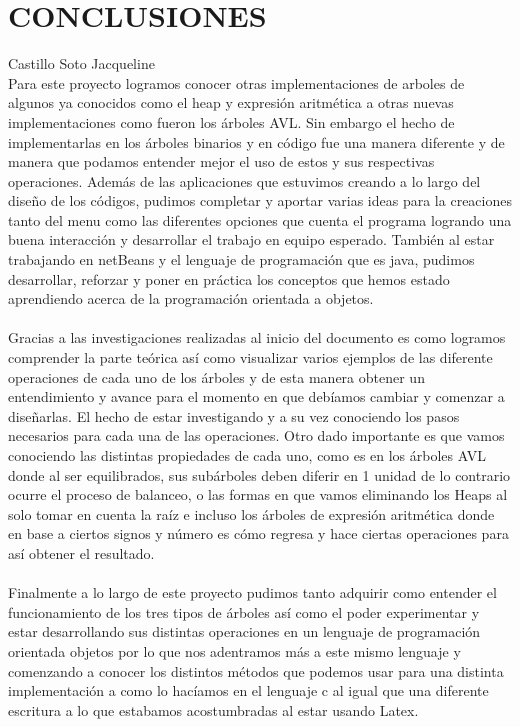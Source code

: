 \documentclass{report}
\begin{document}
\section{CONCLUSIONES}
Castillo Soto Jacqueline\\
Para este proyecto logramos conocer otras implementaciones de arboles de algunos ya conocidos como el heap y expresión aritmética a otras nuevas implementaciones como fueron los árboles AVL. Sin embargo el hecho de implementarlas en los árboles binarios y en código fue una manera diferente y de manera que podamos entender mejor el uso de estos y sus respectivas operaciones. Además de las aplicaciones que estuvimos creando a lo largo del diseño de los códigos, pudimos completar y aportar varias ideas para la creaciones tanto del menu como las diferentes opciones que cuenta el programa logrando una buena interacción y desarrollar el trabajo en equipo esperado. También al estar trabajando en netBeans y el lenguaje de programación que es java, pudimos desarrollar, reforzar y poner en práctica los conceptos que hemos estado aprendiendo acerca de la programación orientada a objetos.\\\\
Gracias a las investigaciones realizadas al inicio del documento es como logramos comprender la parte teórica así como visualizar varios ejemplos de las diferente operaciones de cada uno de los árboles y de esta manera obtener un entendimiento y avance para el momento en que debíamos cambiar y comenzar a diseñarlas. El hecho de estar investigando y a su vez conociendo los pasos necesarios para cada una de las operaciones. Otro dado importante es que vamos conociendo las distintas propiedades de cada uno, como es en los árboles AVL donde al ser equilibrados, sus subárboles deben diferir en 1 unidad de lo contrario ocurre el proceso de balanceo, o las formas en que vamos eliminando los Heaps al solo tomar en cuenta la raíz e incluso los árboles de expresión aritmética donde en base a ciertos signos y número es cómo regresa y hace ciertas operaciones para así obtener el resultado.\\\\
Finalmente a lo largo de este proyecto pudimos tanto adquirir como entender el funcionamiento de los tres tipos de árboles así como el poder experimentar y estar desarrollando sus distintas operaciones en un lenguaje de programación orientada objetos por lo que nos adentramos más a este mismo lenguaje y comenzando a conocer los distintos métodos que podemos usar para una distinta implementación a como lo hacíamos en el lenguaje c al igual que una diferente escritura a lo que estabamos acostumbradas al estar usando Latex.
\end{document}

